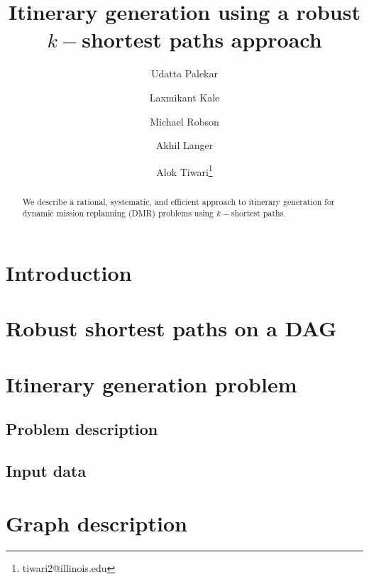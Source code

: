 \documentclass[12pt]{article}
\begin{document}
\title{Itinerary generation using a robust $k-$shortest paths approach}

\author[1]{Udatta Palekar}
\author[2]{Laxmikant Kale}
\author[2]{Michael Robson}
\author[2]{Akhil Langer}
\author[3]{Alok Tiwari\thanks{tiwari2@illinois.edu}}


\renewcommand\Authands{, and }


\maketitle
\begin{abstract}
We describe a rational, systematic, and efficient approach to itinerary generation for dynamic mission replanning (DMR) problems using $k-$shortest paths. 
\end{abstract}

\section{Introduction}\label{sec:intro}

\section{Robust shortest paths on a DAG}

\section{Itinerary generation problem}\label{sec:problem}
\subsection{Problem description}\label{subsec:desc}

\subsection{Input data}\label{subsec:data}

\section{Graph description}\label{sec:graph}
\end{document}
